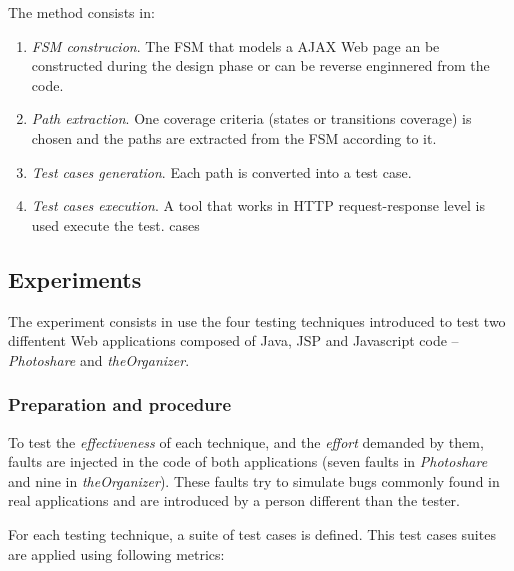 \documentclass[a4paper, twocolumn]{ieee}
\begin{document}
The method consists in: 

\begin{enumerate}
\item \emph{FSM construcion}. The FSM that models a AJAX Web page an be constructed during the design phase or can be reverse enginnered from the code.
\item \emph{Path extraction}. One coverage criteria (states or transitions coverage) is chosen and the paths are extracted from the FSM according to it.
\item \emph{Test cases generation}. Each path is converted into a test case.
\item \emph{Test cases execution}. A tool that works in HTTP request-response level is used execute the test. cases
\end{enumerate}

\subsection{Experiments}

The experiment consists in use the four testing techniques introduced to test two diffentent Web applications composed of Java, JSP and Javascript code -- \emph{Photoshare} and \emph{theOrganizer}.

\subsubsection{Preparation and procedure}

To test the \emph{effectiveness} of each technique, and the \emph{effort} demanded by them, faults are injected in the code of both applications (seven faults in \emph{Photoshare} and nine in \emph{theOrganizer}).
These faults try to simulate bugs commonly found in real applications and are introduced by a person different than the tester.

For each testing technique, a suite of test cases is defined.
This test cases suites are applied using following metrics:
\end{document}
